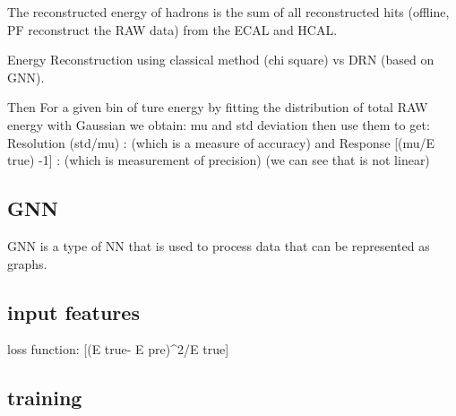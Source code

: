 The reconstructed energy of hadrons is the sum of all reconstructed hits (offline, PF reconstruct the RAW data) from the ECAL and HCAL.

Energy Reconstruction using classical  method (chi square) vs DRN (based on GNN).

Then For a given bin of ture energy
by fitting the distribution of total RAW energy with Gaussian we obtain: mu and std deviation then use them to get:
Resolution (std/mu) : (which is a measure of accuracy)
and Response [(mu/E true) -1] : (which is measurement of precision) (we can see that is not linear)


\subsection{GNN}
GNN is a type of NN that is used to process data that can be represented as graphs.

\subsection{input features}


loss function:  [(E true- E pre)^2/E true] %


\subsection{training}


